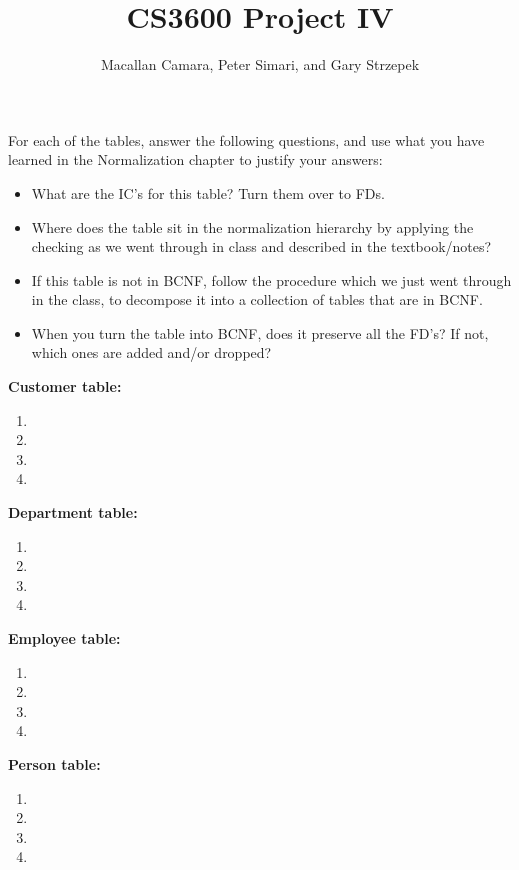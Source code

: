 \documentclass{article}
\title{CS3600 Project IV}
\author{Macallan Camara, Peter Simari, and Gary Strzepek}
\begin{document}
  \maketitle
  \par For each of the tables, answer the following questions, and use what you
  have learned in the Normalization chapter to justify your answers:
  \begin{itemize}
  	\item What are the IC's for this table? Turn them over to FDs.
  	\item Where does the table sit in the normalization hierarchy by applying the
  	checking as we went through in class and described in the textbook/notes?
  	\item If this table is not in BCNF, follow the procedure which we just went
  	through in the class, to decompose it into a collection of tables that are in
  	BCNF.
  	\item When you turn the table into BCNF, does it preserve all the FD's? If
  	not, which ones are added and/or dropped?
  \end{itemize}
  \par\textbf{Customer table:}
  \begin{enumerate}[label=\roman*]
  	\item
  	\item
  	\item
  	\item
  \end{enumerate}
  \par\textbf{Department table:}
  \begin{enumerate}[label=\roman*]
  	\item
  	\item
  	\item
  	\item
  \end{enumerate}
  \par\textbf{Employee table:}
  \begin{enumerate}[label=\roman*]
  	\item
  	\item
  	\item
  	\item
  \end{enumerate}
  \par\textbf{Person table:}
  \begin{enumerate}[label=\roman*]
  	\item
  	\item
  	\item
  	\item
  \end{enumerate}
\end{document}
